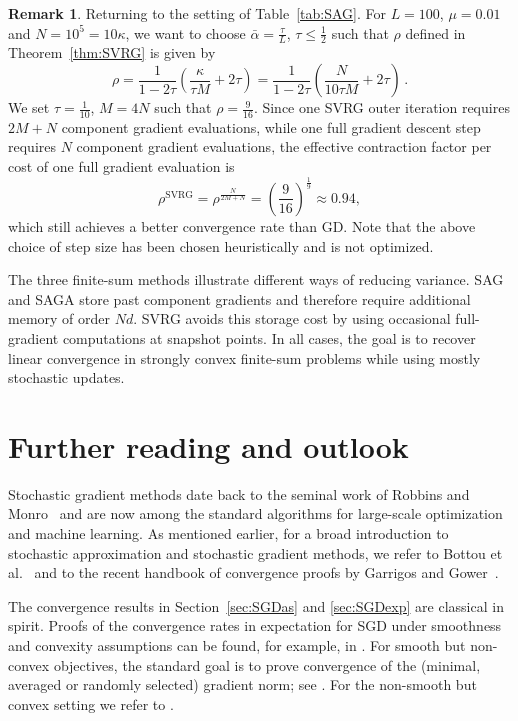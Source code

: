\documentclass[12pt,openany]{book}
\theoremstyle{definition}
\newtheorem{remark}[thm]{Remark}
\theoremstyle{definition}
\begin{document}
\begin{remark}
Returning to the setting of Table~\ref{tab:SAG}. For $L=100$, $\mu=0.01$ and $N=10^5=10\kappa$, we want to choose $\bar\alpha=\frac{\tau}{L}$, $\tau\le\frac12$ such that $\rho$ defined in Theorem~\ref{thm:SVRG} is given by
\[\rho = \frac{1}{1-2\tau}\left(\frac{\kappa}{\tau M} + 2\tau\right) = \frac{1}{1-2\tau}\left(\frac{N}{10 \tau M} + 2\tau\right)\,. \]
We set $\tau = \frac1{10}$, $M=4N$ such that $\rho=\frac9{16}$. Since one SVRG outer iteration requires $2M+N$ component gradient evaluations, while one full
gradient descent step requires $N$ component gradient evaluations, the effective contraction factor
per cost of one full gradient evaluation is
\[\rho^{\mathrm{SVRG}} = \rho^{\frac{N}{2M+N}} = \left(\frac{9}{16}\right)^{\frac{1}{9}} \approx 0.94, \]
which still achieves a better convergence rate than GD. Note that the above choice of step size has been chosen heuristically and is not optimized. 
\end{remark}

The three finite-sum methods illustrate different ways of reducing variance. SAG and SAGA store past component gradients and therefore require additional memory of order $Nd$. SVRG avoids this storage cost by using occasional full-gradient computations at snapshot points. In all cases, the goal is to recover linear convergence in strongly convex finite-sum problems while using mostly stochastic updates.


\section{Further reading and outlook}
Stochastic gradient methods date back to the seminal work of Robbins and Monro~\cite{RM1951} and
are now among the standard algorithms for large-scale optimization and machine learning. As mentioned earlier, for a broad introduction to stochastic approximation and stochastic gradient methods, we refer to
Bottou et al.~\cite{Bottou2018} and to the recent handbook of convergence proofs by Garrigos and Gower~\cite{garrigos2023handbook}.

The convergence results in Section~\ref{sec:SGDas} and \ref{sec:SGDexp} are classical in spirit. Proofs of the convergence rates in expectation for SGD under smoothness and convexity assumptions can be found, for example, in \cite{moulines11,Nguyen2018,poliak1987introduction}. For smooth but non-convex objectives, the standard goal is to prove convergence of the (minimal, averaged or randomly selected) gradient norm; see \cite{ghadimi-lan13}. For the non-smooth but convex setting we refer to \cite{Lan2021}. 
\end{document}
